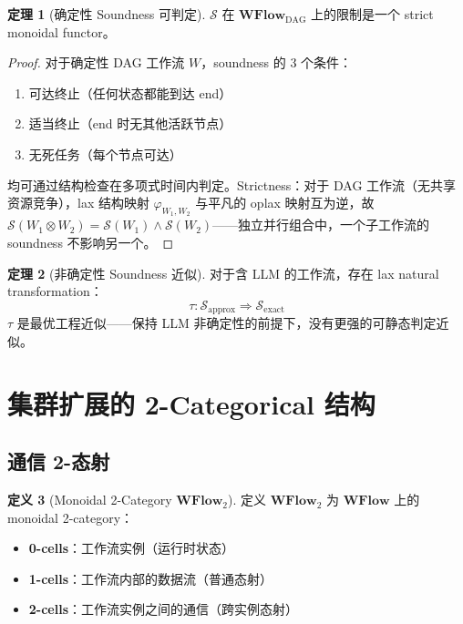 \documentclass[11pt,a4paper]{article}
\theoremstyle{definition}
\newtheorem{theorem}{定理}[section]
\theoremstyle{definition}
\newtheorem{definition}[theorem]{定义}
\theoremstyle{remark}
\newcommand{\cat}[1]{\mathbf{#1}}
\newcommand{\catWFlow}{\cat{WFlow}}
\newcommand{\natarrow}{\Rightarrow}
\newcommand{\tensor}{\otimes}
\begin{document}
\begin{theorem}[确定性 Soundness 可判定]
$\mathcal{S}$ 在 $\catWFlow_{\mathrm{DAG}}$ 上的限制是一个 strict monoidal functor。
\label{thm:soundness-deterministic}
\end{theorem}

\begin{proof}
对于确定性 DAG 工作流 $W$，soundness 的 3 个条件：
\begin{enumerate}[leftmargin=2em,label=(\arabic*)]
    \item 可达终止（任何状态都能到达 end）
    \item 适当终止（end 时无其他活跃节点）
    \item 无死任务（每个节点可达）
\end{enumerate}
均可通过结构检查在多项式时间内判定。Strictness：对于 DAG 工作流（无共享资源竞争），lax 结构映射 $\varphi_{W_1,W_2}$ 与平凡的 oplax 映射互为逆，故 $\mathcal{S}(W_1 \tensor W_2) = \mathcal{S}(W_1) \land \mathcal{S}(W_2)$——独立并行组合中，一个子工作流的 soundness 不影响另一个。
\end{proof}

\begin{theorem}[非确定性 Soundness 近似]
对于含 LLM 的工作流，存在 lax natural transformation：
\[
\tau: \mathcal{S}_{\mathrm{approx}} \natarrow \mathcal{S}_{\mathrm{exact}}
\]
$\tau$ 是最优工程近似——保持 LLM 非确定性的前提下，没有更强的可静态判定近似。
\label{thm:soundness-approx}
\end{theorem}

\section{集群扩展的 2-Categorical 结构}

\subsection{通信 2-态射}

\begin{definition}[Monoidal 2-Category $\catWFlow_2$]
定义 $\catWFlow_2$ 为 $\catWFlow$ 上的 monoidal 2-category：
\begin{itemize}[leftmargin=2em]
    \item \textbf{0-cells}：工作流实例（运行时状态）
    \item \textbf{1-cells}：工作流内部的数据流（普通态射）
    \item \textbf{2-cells}：工作流实例之间的通信（跨实例态射）
\end{itemize}
\end{definition}
\end{document}
